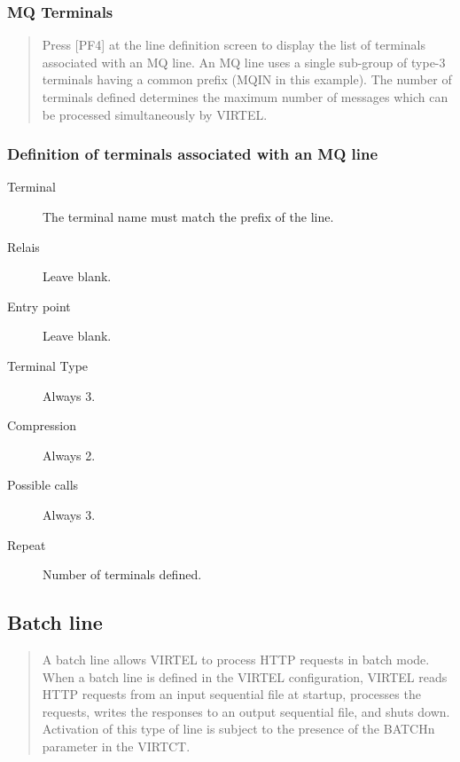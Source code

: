 \documentclass[letterpaper,10pt,english]{sphinxmanual}
\begin{document}
\subsubsection{MQ Terminals}
\label{\detokenize{connectivity_guide:mq-terminals}}\begin{quote}

Press {[}PF4{]} at the line definition screen to display the list of terminals associated with an MQ line. An MQ line uses a single sub-group of type-3 terminals having a common prefix (MQIN in this example). The number of terminals defined determines the maximum number of messages which can be processed simultaneously by VIRTEL.
\end{quote}



\subsubsection{Definition of terminals associated with an MQ line}
\label{\detokenize{connectivity_guide:definition-of-terminals-associated-with-an-mq-line}}\begin{description}
\item[{Terminal}] \leavevmode
The terminal name must match the prefix of the line.

\item[{Relais}] \leavevmode
Leave blank.

\item[{Entry point}] \leavevmode
Leave blank.

\item[{Terminal Type}] \leavevmode
Always 3.

\item[{Compression}] \leavevmode
Always 2.

\item[{Possible calls}] \leavevmode
Always 3.

\item[{Repeat}] \leavevmode
Number of terminals defined.

\end{description}


\subsection{Batch line}
\label{\detokenize{connectivity_guide:batch-line}}\begin{quote}

A batch line allows VIRTEL to process HTTP requests in batch mode. When a batch line is defined in the VIRTEL configuration, VIRTEL reads HTTP requests from an input sequential file at startup, processes the requests, writes the responses to an output sequential file, and shuts down. Activation of this type of line is subject to the presence of the BATCHn parameter in the VIRTCT.
\end{quote}
\end{document}

